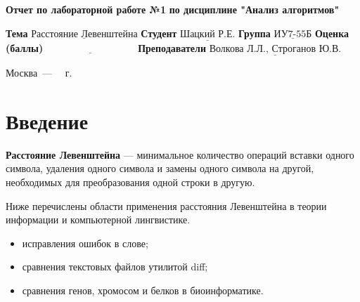 \documentclass[12pt]{report}
\begin{document}
\begin{titlepage}
        \begin{center}
            \noindent\begin{minipage}{1.3\textwidth}
                         \centering
                         \Large\textbf{  Отчет по лабораторной работе №1}\newline
                         \textbf{по дисциплине "Анализ алгоритмов"}\newline\newline
            \end{minipage}
        \end{center}

        \noindent\textbf{Тема} $\underline{\text{Расстояние Левенштейна}}$\newline\newline
        \noindent\textbf{Студент} $\underline{\text{Шацкий Р.Е.}}$\newline\newline
        \noindent\textbf{Группа} $\underline{\text{ИУ7-55Б}}$\newline\newline
        \noindent\textbf{Оценка (баллы)} $\underline{\text{~~~~~~~~~~~~~~~~~~~~~~~~~~~}}$\newline\newline
        \noindent\textbf{Преподаватели} $\underline{\text{Волкова Л.Л., Строганов Ю.В.}}$\newline\newline\newline

        \begin{center}
            \vfill
            Москва~---~\the\year
            ~г.
        \end{center}
    \end{titlepage}

    \tableofcontents

    \newpage
    \chapter*{Введение}
    \textbf{Расстояние Левенштейна} --- минимальное количество операций вставки одного символа, удаления одного символа
    и замены одного символа на другой, необходимых для преобразования одной строки в другую.

    Ниже перечислены области применения расстояния Левенштейна в теории информации и компьютерной лингвистике.
    \begin{itemize}
        \item исправления ошибок в слове;
        \item сравнения текстовых файлов утилитой diff;
        \item сравнения генов, хромосом и белков в биоинформатике.
    \end{itemize}
\end{document}
